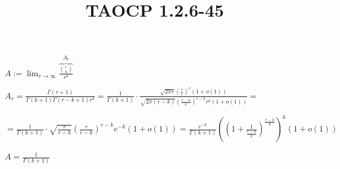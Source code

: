 \documentclass{article}
\title{TAOCP 1.2.6\mbox{-}45}
\begin{document}
\maketitle

\( A := \lim_{r \to \infty} \overbrace{\frac{\binom{r}{k}}{r^{k}}}^{A_{r}} \)

\( A_{r} = \frac{\Gamma(r+1)}{\Gamma(k+1)\Gamma(r-k+1) r^{k}} = \frac{1}{\Gamma(k+1)} \cdot \frac{\sqrt{2 \pi r} {\left(\frac{r}{e}\right)}^{r} (1 + o(1))}{\sqrt{2 \pi (r-k)} {\left(\frac{r-k}{e}\right)}^{r-k} r^{k} (1 + o(1))} = \)

\( = \frac{1}{\Gamma(k+1)} \cdot \sqrt{\frac{r}{r-k}} {\left(\frac{r}{r-k}\right)}^{r-k} e^{-k} (1+o(1)) = \frac{e^{-k}}{\Gamma(k+1)} {\left({\left(1 + \frac{1}{\frac{r-k}{k}}\right)}^{\frac{r-k}{k}}\right)}^{k} (1+o(1)) \)

\( A = \frac{1}{\Gamma(k+1)} \)
\end{document}
